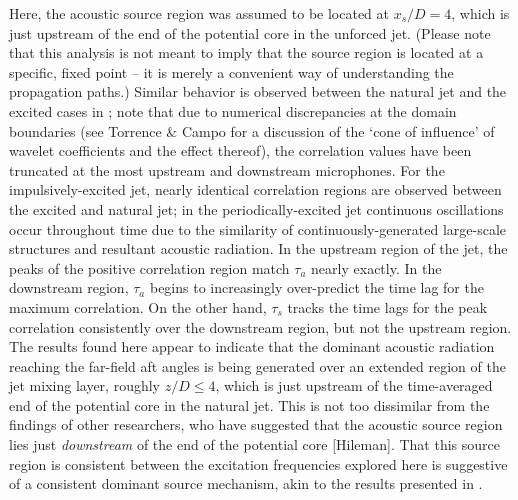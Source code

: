Here, the acoustic source region was assumed to be located at $x_s /D = 4$, which is just upstream of the end of the potential core in the unforced jet. 
(Please note that this analysis is not meant to imply that the source region is located at a specific, fixed point – it is merely a convenient way of understanding the propagation paths.)
Similar behavior is observed between the natural jet and the excited cases in ; note that due to numerical discrepancies at the domain boundaries (see Torrence \& Campo for a discussion of the `cone of influence' of wavelet coefficients and the effect thereof), the correlation values have been truncated at the most upstream and downstream microphones.
For the impulsively-excited jet, nearly identical correlation regions are observed between the excited and natural jet; in the periodically-excited jet continuous oscillations occur throughout time due to the similarity of continuously-generated large-scale structures and resultant acoustic radiation.
In the upstream region of the jet, the peaks of the positive correlation region match $\tau_a$ nearly exactly. 
In the downstream region, $\tau_a$ begins to increasingly over-predict the time lag for the maximum correlation. 
On the other hand, $\tau_s$ tracks the time lags for the peak correlation consistently over the downstream region, but not the upstream region. 
The results found here appear to indicate that the dominant acoustic radiation reaching the far-field aft angles is being generated over an extended region of the jet mixing layer, roughly $z/D \leq 4$, which is just upstream of the time-averaged end of the potential core in the natural jet.
This is not too dissimilar from the findings of other researchers, who have suggested that the acoustic source region lies just \textit{downstream} of the end of the potential core [Hileman].
That this source region is consistent between the excitation frequencies explored here is suggestive of a consistent dominant source mechanism, akin to the results presented in .
